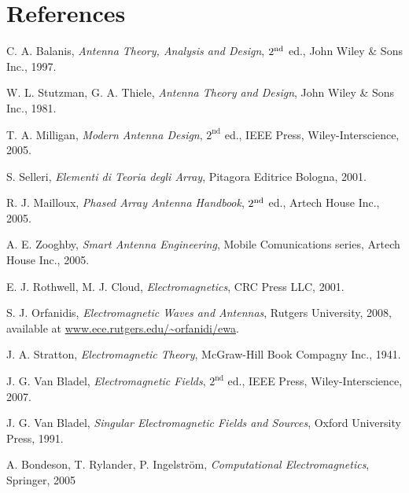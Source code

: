 \cleardoublepage
{}
\thispagestyle{myheadings}
\renewcommand\thefigure{\arabic{figure}}
\pagestyle{myheadings}
\chapter*{References}
\begin{thebibliography}{99}


 C. A. Balanis, \emph{Antenna Theory, Analysis and Design}, $2^{\mathrm{nd}}$ ed., John Wiley \& Sons Inc., 1997.

 W. L. Stutzman, G. A. Thiele, \emph{Antenna Theory and Design}, John Wiley \& Sons Inc., 1981.

 T. A. Milligan, \emph{Modern Antenna Design}, $2^\mathrm{nd}$ ed., IEEE Press, Wiley-Interscience, 2005.

 S. Selleri, \emph{Elementi di Teoria degli Array}, Pitagora Editrice Bologna, 2001.

 R. J. Mailloux, \emph{Phased Array Antenna Handbook}, $2^{\mathrm{nd}}$ ed.,  Artech House Inc., 2005.

 A. E. Zooghby, \emph{Smart Antenna Engineering}, Mobile Comunications series,  Artech House Inc., 2005.

 E. J. Rothwell, M. J. Cloud, \emph{Electromagnetics}, CRC Press LLC, 2001.

 S. J. Orfanidis, \emph{Electromagnetic Waves and Antennas}, Rutgers University, 2008, available at \url{www.ece.rutgers.edu/~orfanidi/ewa}.

 J. A. Stratton, \emph{Electromagnetic Theory}, McGraw-Hill Book Compagny Inc., 1941.

 J. G. Van Bladel, \emph{Electromagnetic Fields}, $2^\mathrm{nd}$ ed., IEEE Press, Wiley-Interscience, 2007.

 J. G. Van Bladel, \emph{Singular Electromagnetic Fields and Sources}, Oxford University Press, 1991.

 A. Bondeson, T. Rylander, P. Ingelstr\"{o}m, \emph{Computational Electromagnetics}, Springer, 2005


\end{thebibliography}
